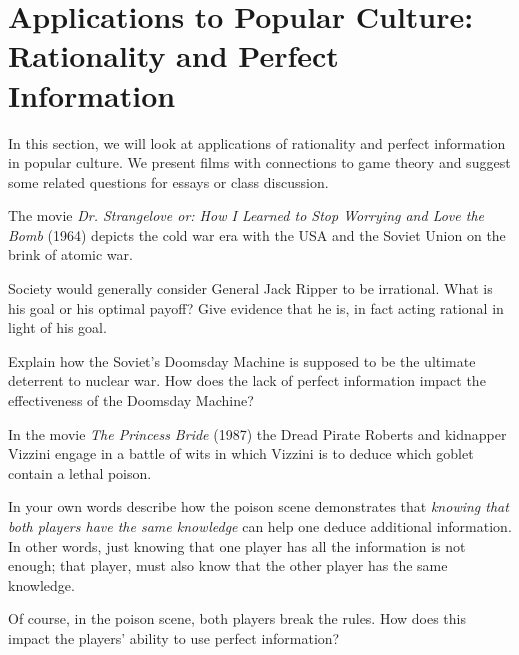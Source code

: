 
\section{Applications to Popular Culture: Rationality and Perfect Information}




In this section, we will look at applications of rationality and perfect information in popular culture. We present films with connections to game theory and suggest some related questions for essays or class discussion.


The movie \textit{Dr. Strangelove or: How I Learned to Stop Worrying and Love the Bomb} (1964) depicts the cold war era with the USA and the Soviet Union on the brink of atomic war. 

\begin{writing}
Society would generally consider General Jack Ripper to be irrational. What is his goal or his optimal payoff? Give evidence that he is, in fact acting rational in light of his goal. 
\end{writing}

\begin{writing}Explain how the Soviet's Doomsday Machine is supposed to be the ultimate deterrent to nuclear war. How does the lack of perfect information impact the effectiveness of the Doomsday Machine?
\end{writing}

In the movie \textit{The Princess Bride} (1987) the Dread Pirate Roberts and kidnapper Vizzini engage in a battle of wits in which Vizzini is to deduce which goblet contain a lethal poison.


\begin{writing}
In your own words describe how the poison scene demonstrates that \emph{knowing that both players have the same knowledge} can help  one deduce additional information. In other words, just knowing that one player has all the information is not enough; that player, must also know that the other player has the same knowledge.
\end{writing}

\begin{writing}
Of course, in the poison scene, both players break the rules. How does this impact the players' ability to use perfect information? 
\end{writing}



